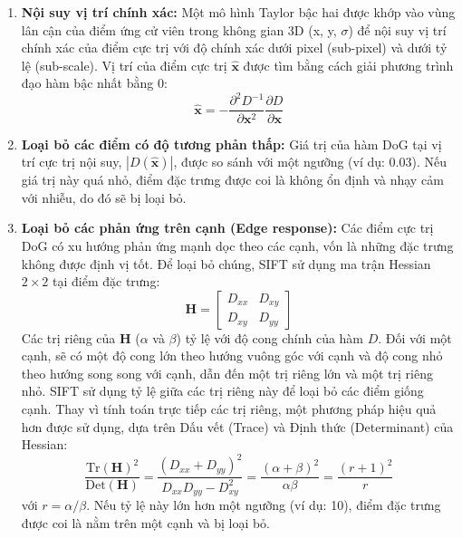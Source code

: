 \begin{enumerate}
    \item \textbf{Nội suy vị trí chính xác:} Một mô hình Taylor bậc hai được khớp vào vùng lân cận của điểm ứng cử viên trong không gian 3D (x, y, $\sigma$) để nội suy vị trí chính xác của điểm cực trị với độ chính xác dưới pixel (sub-pixel) và dưới tỷ lệ (sub-scale). Vị trí của điểm cực trị $\hat{\mathbf{x}}$ được tìm bằng cách giải phương trình đạo hàm bậc nhất bằng 0:
    \begin{equation}
        \hat{\mathbf{x}} = - \frac{\partial^2 D^{-1}}{\partial \mathbf{x}^2} \frac{\partial D}{\partial \mathbf{x}}
    \end{equation}
    
    \item \textbf{Loại bỏ các điểm có độ tương phản thấp:} Giá trị của hàm DoG tại vị trí cực trị nội suy, $|D(\hat{\mathbf{x}})|$, được so sánh với một ngưỡng (ví dụ: 0.03). Nếu giá trị này quá nhỏ, điểm đặc trưng được coi là không ổn định và nhạy cảm với nhiễu, do đó sẽ bị loại bỏ.

    \item \textbf{Loại bỏ các phản ứng trên cạnh (Edge response):} Các điểm cực trị DoG có xu hướng phản ứng mạnh dọc theo các cạnh, vốn là những đặc trưng không được định vị tốt. Để loại bỏ chúng, SIFT sử dụng ma trận Hessian $2 \times 2$ tại điểm đặc trưng:
    \begin{equation}
        \mathbf{H} = \begin{bmatrix} D_{xx} & D_{xy} \\ D_{xy} & D_{yy} \end{bmatrix}
    \end{equation}
    Các trị riêng của $\mathbf{H}$ ($\alpha$ và $\beta$) tỷ lệ với độ cong chính của hàm $D$. Đối với một cạnh, sẽ có một độ cong lớn theo hướng vuông góc với cạnh và độ cong nhỏ theo hướng song song với cạnh, dẫn đến một trị riêng lớn và một trị riêng nhỏ. SIFT sử dụng tỷ lệ giữa các trị riêng này để loại bỏ các điểm giống cạnh. Thay vì tính toán trực tiếp các trị riêng, một phương pháp hiệu quả hơn được sử dụng, dựa trên Dấu vết (Trace) và Định thức (Determinant) của Hessian:
    \begin{equation}
        \frac{\text{Tr}(\mathbf{H})^2}{\text{Det}(\mathbf{H})} = \frac{(D_{xx} + D_{yy})^2}{D_{xx}D_{yy} - D_{xy}^2} = \frac{(\alpha + \beta)^2}{\alpha \beta} = \frac{(r+1)^2}{r}
    \end{equation}
    với $r = \alpha/\beta$. Nếu tỷ lệ này lớn hơn một ngưỡng (ví dụ: 10), điểm đặc trưng được coi là nằm trên một cạnh và bị loại bỏ.
\end{enumerate}

